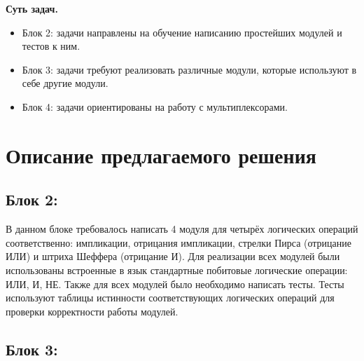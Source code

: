 \documentclass[a4paper]{article}
\begin{document}
\textbf{Суть задач.}
\begin{itemize} [leftmargin=3.5em, topsep=0pt]
	\item Блок 2: задачи направлены на обучение написанию простейших модулей и тестов к ним.

	\item Блок 3: задачи требуют реализовать различные модули, которые используют в себе другие модули.

	\item Блок 4: задачи ориентированы на работу с мультиплексорами.
\end{itemize}

\section{Описание предлагаемого решения}

\subsection{Блок 2:}

В данном блоке требовалось написать 4 модуля для четырёх логических операций соответственно: импликации, отрицания импликации, стрелки Пирса (отрицание ИЛИ) и штриха Шеффера (отрицание И). Для реализации всех модулей были использованы встроенные в язык стандартные побитовые логические операции: ИЛИ, И, НЕ. Также для всех модулей было необходимо написать тесты. Тесты используют таблицы истинности соответствующих логических операций для проверки корректности работы модулей.

\subsection{Блок 3:}
\end{document}
